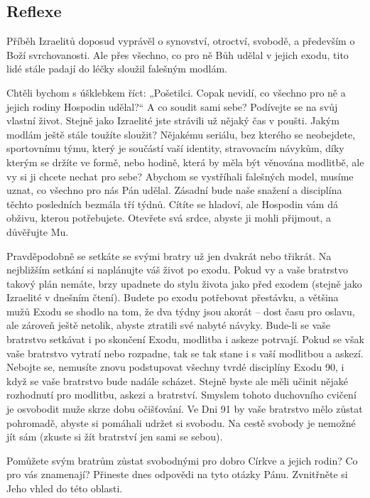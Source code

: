 \documentclass[11pt]{article}
\begin{document}
\subsection*{Reflexe}
Příběh Izraelitů doposud vyprávěl o synovství, otroctví, svobodě, a především o Boží svrchovanosti. Ale přes všechno,
co pro ně Bůh udělal v jejich exodu, tito lidé stále padají do léčky sloužil falešným modlám.

Chtěli bychom s úšklebkem říct: „Pošetilci. Copak nevidí, co všechno pro ně a jejich rodiny Hospodin udělal?“ A co
soudit sami sebe? Podívejte se na svůj vlastní život. Stejně jako Izraelité jste strávili už nějaký čas v poušti. Jakým
modlám ještě stále toužíte sloužit? Nějakému seriálu, bez kterého se neobejdete, sportovnímu týmu, který je součástí
vaší identity, stravovacím návykům, díky kterým se držíte ve formě, nebo hodině, která by měla být věnována
modlitbě, ale vy si ji chcete nechat pro sebe? Abychom se vystříhali falešných model, musíme uznat, co všechno pro
nás Pán udělal. Zásadní bude naše snažení a disciplína těchto posledních bezmála tří týdnů. Cítíte se hladoví, ale
Hospodin vám dá obživu, kterou potřebujete. Otevřete svá srdce, abyste ji mohli přijmout, a důvěřujte Mu.

Pravděpodobně se setkáte se svými bratry už jen dvakrát nebo třikrát. Na nejbližším setkání si naplánujte váš život po
exodu. Pokud vy a vaše bratrstvo takový plán nemáte, brzy upadnete do stylu života jako před exodem (stejně jako
Izraelité v dnešním čtení). Budete po exodu potřebovat přestávku, a většina mužů Exodu se shodlo na tom, že dva
týdny jsou akorát – dost času pro oslavu, ale zároveň ještě netolik, abyste ztratili své nabyté návyky. Bude-li se vaše
bratrstvo setkávat i po skončení Exodu, modlitba i askeze potrvají. Pokud se však vaše bratrstvo vytratí nebo rozpadne,
tak se tak stane i s vaší modlitbou a askezí. Nebojte se, nemusíte znovu podstupovat všechny tvrdé disciplíny Exodu
90, i když se vaše bratrstvo bude nadále scházet. Stejně byste ale měli učinit nějaké rozhodnutí pro modlitbu, askezi a
bratrství. Smyslem tohoto duchovního cvičení je osvobodit muže skrze dobu očišťování. Ve Dni 91 by vaše bratrstvo
mělo zůstat pohromadě, abyste si pomáhali udržet si svobodu. Na cestě svobody je nemožné jít sám (zkuste si žít
bratrství jen sami se sebou).

Pomůžete svým bratrům zůstat svobodnými pro dobro Církve a jejich rodin? Co pro vás znamenají? Přineste dnes
odpovědi na tyto otázky Pánu. Zvnitřněte si Jeho vhled do této oblasti.
\end{document}
